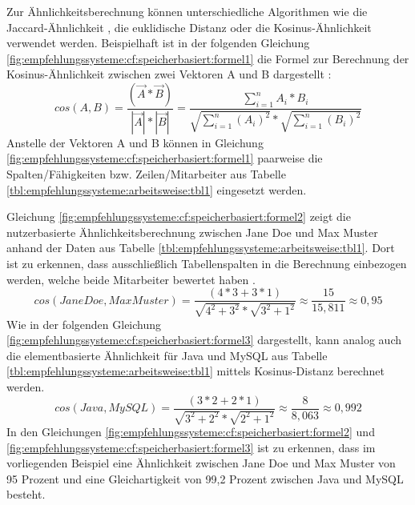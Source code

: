 Zur Ähnlichkeitsberechnung können unterschiedliche Algorithmen wie die Jaccard-Ähnlichkeit \cite[S. 2]{bharti:2019}, die euklidische Distanz \cite[S. 3]{cheng:2013} oder die Kosinus-Ähnlichkeit \cite[S. 2]{duong:2018} verwendet werden. Beispielhaft ist in der folgenden Gleichung \ref{fig:empfehlungssysteme:cf:speicherbasiert:formel1} die Formel zur Berechnung der Kosinus-Ähnlichkeit zwischen zwei Vektoren A und B dargestellt \cite[S. 111]{bharti:2019}:
\begin{equation}
cos(A,B) = \frac{(\vec{A} * \vec{B})}{|\vec{A}| * |\vec{B}|} = \frac{\sum_{i=1}^n A_i * B_i}{\sqrt{\sum_{i=1}^n (A_i)^2} * \sqrt{\sum_{i=1}^n (B_i)^2}}
\label{fig:empfehlungssysteme:cf:speicherbasiert:formel1}
\end{equation}
Anstelle der Vektoren A und B können in Gleichung \ref{fig:empfehlungssysteme:cf:speicherbasiert:formel1} paarweise die Spalten/Fähigkeiten bzw. Zeilen/Mitarbeiter aus Tabelle \ref{tbl:empfehlungssysteme:arbeitsweise:tbl1} eingesetzt werden.

Gleichung \ref{fig:empfehlungssysteme:cf:speicherbasiert:formel2} zeigt die nutzerbasierte Ähnlichkeitsberechnung zwischen Jane Doe und Max Muster anhand der Daten aus Tabelle \ref{tbl:empfehlungssysteme:arbeitsweise:tbl1}. Dort ist zu erkennen, dass ausschließlich Tabellenspalten in die Berechnung einbezogen werden, welche beide Mitarbeiter bewertet haben \cite[S. 2f.]{hao:2013}.
\begin{equation}
	cos(Jane Doe,Max Muster) = \frac{(4*3 + 3*1)}{\sqrt{4^2 + 3^2} * \sqrt{3^2 + 1^2}} \approx \frac{15}{15,811} \approx 0,95
	\label{fig:empfehlungssysteme:cf:speicherbasiert:formel2}
\end{equation}
Wie in der folgenden Gleichung \ref{fig:empfehlungssysteme:cf:speicherbasiert:formel3} dargestellt, kann analog auch die elementbasierte Ähnlichkeit für Java und MySQL aus Tabelle \ref{tbl:empfehlungssysteme:arbeitsweise:tbl1} mittels Kosinus-Distanz berechnet werden.
\begin{equation}
	cos(Java, MySQL) = \frac{(3*2 + 2*1)}{\sqrt{3^2 + 2^2} * \sqrt{2^2 + 1^2}} \approx \frac{8}{8,063} \approx 0,992
	\label{fig:empfehlungssysteme:cf:speicherbasiert:formel3}
\end{equation}
In den Gleichungen \ref{fig:empfehlungssysteme:cf:speicherbasiert:formel2} und \ref{fig:empfehlungssysteme:cf:speicherbasiert:formel3} ist zu erkennen, dass im vorliegenden Beispiel eine Ähnlichkeit zwischen Jane Doe und Max Muster von 95 Prozent und eine Gleichartigkeit von 99,2 Prozent zwischen Java und MySQL besteht.%

